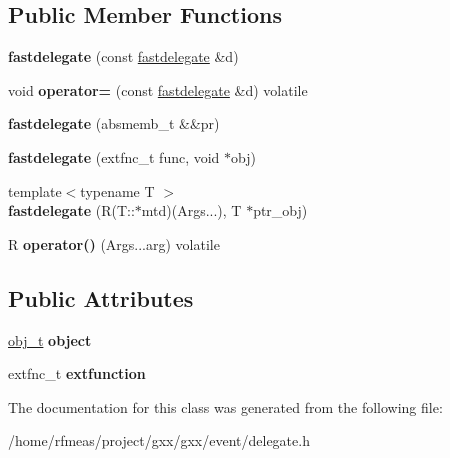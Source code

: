 \subsection*{Public Member Functions}
\begin{DoxyCompactItemize}
\item 
{\bfseries fastdelegate} (const \hyperlink{classgxx_1_1fastdelegate}{fastdelegate} \&d)\hypertarget{classgxx_1_1fastdelegate_a6f44f6a4a2d8259e5e590ceb9e58ac3e}{}\label{classgxx_1_1fastdelegate_a6f44f6a4a2d8259e5e590ceb9e58ac3e}

\item 
void {\bfseries operator=} (const \hyperlink{classgxx_1_1fastdelegate}{fastdelegate} \&d) volatile\hypertarget{classgxx_1_1fastdelegate_a4c3883445f45325e8d4def105e3db034}{}\label{classgxx_1_1fastdelegate_a4c3883445f45325e8d4def105e3db034}

\item 
{\bfseries fastdelegate} (absmemb\+\_\+t \&\&pr)\hypertarget{classgxx_1_1fastdelegate_a0ed9883a0077673a5607d240e1f2eab3}{}\label{classgxx_1_1fastdelegate_a0ed9883a0077673a5607d240e1f2eab3}

\item 
{\bfseries fastdelegate} (extfnc\+\_\+t func, void $\ast$obj)\hypertarget{classgxx_1_1fastdelegate_a54e9db865ad0866960dd4af79fc01a4a}{}\label{classgxx_1_1fastdelegate_a54e9db865ad0866960dd4af79fc01a4a}

\item 
{\footnotesize template$<$typename T $>$ }\\{\bfseries fastdelegate} (R(T\+::$\ast$mtd)(Args...), T $\ast$ptr\+\_\+obj)\hypertarget{classgxx_1_1fastdelegate_ad6f432da1279e7ea6c6116635a117849}{}\label{classgxx_1_1fastdelegate_ad6f432da1279e7ea6c6116635a117849}

\item 
R {\bfseries operator()} (Args...\+arg) volatile\hypertarget{classgxx_1_1fastdelegate_a0529db2182e3dfceb3b7781fb4149e6b}{}\label{classgxx_1_1fastdelegate_a0529db2182e3dfceb3b7781fb4149e6b}

\end{DoxyCompactItemize}
\subsection*{Public Attributes}
\begin{DoxyCompactItemize}
\item 
\hyperlink{classgxx_1_1AbstractDelegate}{obj\+\_\+t} {\bfseries object}\hypertarget{classgxx_1_1fastdelegate_a64b90c0bab635e4f1e09b1d232bb9d75}{}\label{classgxx_1_1fastdelegate_a64b90c0bab635e4f1e09b1d232bb9d75}

\item 
extfnc\+\_\+t {\bfseries extfunction}\hypertarget{classgxx_1_1fastdelegate_a4d5c926bb2fcc60f27a87590af91805b}{}\label{classgxx_1_1fastdelegate_a4d5c926bb2fcc60f27a87590af91805b}

\end{DoxyCompactItemize}


The documentation for this class was generated from the following file\+:\begin{DoxyCompactItemize}
\item 
/home/rfmeas/project/gxx/gxx/event/delegate.\+h\end{DoxyCompactItemize}
